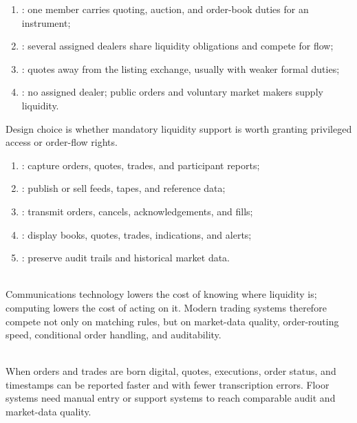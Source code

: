 \documentclass[a4paper,oneside,openany]{book}
\begin{document}
\begin{taxonomy} 
\begin{enumerate}[label=\roman*.]
\setlength{\itemsep}{0pt}
\item {}: one member carries quoting, auction, and order-book duties for an instrument;
\item {}: several assigned dealers share liquidity obligations and compete for flow;
\item {}: quotes away from the listing exchange, usually with weaker formal duties;
\item {}: no assigned dealer; public orders and voluntary market makers supply liquidity.
\end{enumerate}
Design choice is whether mandatory liquidity support is worth granting privileged access or order-flow rights.
\end{taxonomy}

\begin{taxonomy} 
\begin{enumerate}[label=\roman*.]
\setlength{\itemsep}{0pt}
\item {}: capture orders, quotes, trades, and participant reports;
\item {}: publish or sell feeds, tapes, and reference data;
\item {}: transmit orders, cancels, acknowledgements, and fills;
\item {}: display books, quotes, trades, indications, and alerts;
\item {}: preserve audit trails and historical market data.
\end{enumerate}
\end{taxonomy}

\begin{mechanism} \\
Communications technology lowers the cost of knowing where liquidity is; computing lowers the cost of acting on it. Modern trading systems therefore compete not only on matching rules, but on market-data quality, order-routing speed, conditional order handling, and auditability.
\end{mechanism}

\begin{mechanism} \\
When orders and trades are born digital, quotes, executions, order status, and timestamps can be reported faster and with fewer transcription errors. Floor systems need manual entry or support systems to reach comparable audit and market-data quality.
\end{mechanism}
\end{document}
